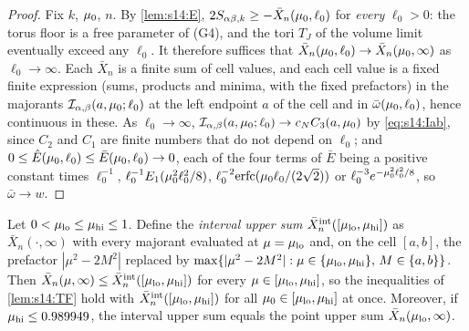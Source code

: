 \begin{proof}
Fix $k$, $\mu_0$, $n$. By \cref{lem:s14:E}, $2S_{\alpha\beta,k}\ge-\bar X_n(\mu_0,\ell_0)$ for \emph{every} $\ell_0>0$: the torus floor is a free parameter of (G4), and the tori $T_J$ of the volume limit eventually exceed any $\ell_0$. It therefore suffices that $\bar X_n(\mu_0,\ell_0)\to\bar X_n(\mu_0,\infty)$ as $\ell_0\to\infty$. Each $\bar X_n$ is a finite sum of cell values, and each cell value is a fixed finite expression (sums, products and minima, with the fixed prefactors) in the majorants $\mathcal I_{\alpha,\beta}(a,\mu_0;\ell_0)$ at the left endpoint $a$ of the cell and in $\bar\omega(\mu_0,\ell_0)$, hence continuous in these. As $\ell_0\to\infty$, $\mathcal I_{\alpha,\beta}(a,\mu_0;\ell_0)\to c_NC_3(a,\mu_0)$ by \eqref{eq:s14:Iab}, since $C_2$ and $C_1$ are finite numbers that do not depend on $\ell_0$; and $0\le\hat E(\mu_0,\ell_0)\le\bar E(\mu_0,\ell_0)\to0$, each of the four terms of $\bar E$ being a positive constant times $\ell_0^{-1}$, $\ell_0^{-1}E_1(\mu_0^2\ell_0^2/8)$, $\ell_0^{-2}\mathrm{erfc}(\mu_0\ell_0/(2\sqrt2))$ or $\ell_0^{-3}e^{-\mu_0^2\ell_0^2/8}$, so $\bar\omega\to w$.
\end{proof}

\begin{lemma}\label{lem:s14:MON}
Let $0<\mu_{\rm lo}\le\mu_{\rm hi}\le1$. Define the \emph{interval upper sum} $\bar X^{\rm int}_n([\mu_{\rm lo},\mu_{\rm hi}])$ as $\bar X_n(\cdot,\infty)$ with every majorant evaluated at $\mu=\mu_{\rm lo}$ and, on the cell $[a,b]$, the prefactor $|\mu^2-2M^2|$ replaced by $\max\{|\mu^2-2M^2|:\mu\in\{\mu_{\rm lo},\mu_{\rm hi}\},\,M\in\{a,b\}\}$. Then $\bar X_n(\mu,\infty)\le\bar X^{\rm int}_n([\mu_{\rm lo},\mu_{\rm hi}])$ for every $\mu\in[\mu_{\rm lo},\mu_{\rm hi}]$, so the inequalities of \cref{lem:s14:TF} hold with $\bar X^{\rm int}_n([\mu_{\rm lo},\mu_{\rm hi}])$ for all $\mu_0\in[\mu_{\rm lo},\mu_{\rm hi}]$ at once. Moreover, if $\mu_{\rm hi}\le0.989949$, the interval upper sum equals the point upper sum $\bar X_n(\mu_{\rm lo},\infty)$.
\end{lemma}

